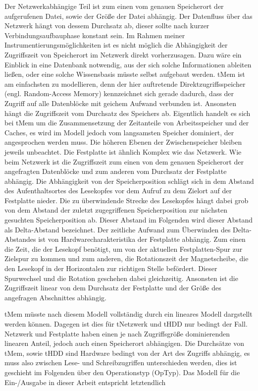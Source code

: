 \documentclass[
	12pt,
	a4paper,
	BCOR10mm,
	DIV14,
	listof=totoc,
	bibliography=totoc,
	headsepline
]{scrreprt}
\begin{document}
Der Netzwerkabhängige Teil ist zum einen vom genauen Speicherort der aufgerufenen Datei, sowie der Größe der Datei abhängig. Der Datenfluss über das Netzwerk hängt von dessem Durchsatz ab, dieser sollte nach kurzer Verbindungsaufbauphase konstant sein. Im Rahmen meiner Instrumentierungsmöglichkeiten ist es nicht möglich die Abhängigkeit der Zugriffszeit von Speicherort im Netzwerk direkt vorherzusagen. Dazu wäre ein Einblick in eine Datenbank notwendig, aus der sich solche Informationen ableiten ließen, oder eine solche Wissensbasis müsste selbst aufgebaut werden.
tMem ist am einfachsten zu modellieren, denn der hier auftretende Direktzugriffsspeicher (engl. Random-Access Memory) kennzeichnet sich gerade dadurch, dass der Zugriff auf alle Datenblöcke mit geichem Aufwand verbunden ist.
Ansonsten hängt die Zugriffszeit vom Durchsatz des Speichers ab.
Eigentlich handelt es sich bei tMem um die Zusammensetzung der Zeitanteile von Arbeitsspeicher und der Caches, es wird im Modell jedoch vom langsamsten Speicher dominiert, der angesprochen werden muss. Die höheren Ebenen der Zwischenspeicher bleiben jeweils unbeachtet.
Die Festplatte ist ähnlich Komplex wie das Netzwerk. Wie beim Netzwerk ist die Zugriffszeit zum einen von dem genauen Speicherort der angefragten Datenblöcke und zum anderen vom Durchsatz der Festplatte abhängig.
Die Abhängigkeit von der Speicherposition schlägt sich in dem Abstand des Aufenthaltsortes des Lesekopfes vor dem Aufruf zu dem Zielort auf der Festplatte nieder. Die zu überwindende Strecke des Lesekopfes hängt dabei grob von dem Abstand der zuletzt zugegriffenen Speicherposition zur nächsten gesuchten Speicherposition ab. Dieser Abstand im Folgenden wird dieser Abstand als Delta-Abstand bezeichnet.
Der zeitliche Aufwand zum Überwinden des Delta-Abstandes ist von Hardwarecharakteristika der Festplatte abhängig. Zum einen die Zeit, die der Lesekopf benötigt, um von der aktuellen Festplatten-Spur zur Zielspur zu kommen und zum anderen, die Rotationszeit der Magnetscheibe, die den Lesekopf in der Horizontalen zur richtigen Stelle befördert. 
Dieser Spurwechsel und die Rotation geschehen dabei gleichzeitig. Ansonsten ist die Zugriffszeit linear von dem Durchsatz der Festplatte und der Größe des angefragen Abschnittes abhängig.

tMem müsste nach diesem Modell vollständig durch ein lineares Modell dargstellt werden können. Dagegen ist dies für tNetzwerk und tHDD nur bedingt der Fall.
Netzwerk und Festplatte haben einen je nach Zugriffsgröße dominierenden linearen Anteil, jedoch auch einen Speicherort abhängigen.
Die Durchsätze von tMem, sowie tHDD sind Hardware bedingt von der Art des Zugriffs abhängig, es muss also zwischen Lese- und Schreibzugriffen unterschieden werden, dies ist geschieht im Folgenden über den Operationstyp (OpTyp).
Das Modell für die Ein-/Ausgabe in dieser Arbeit entspricht letztendlich
\end{document}
